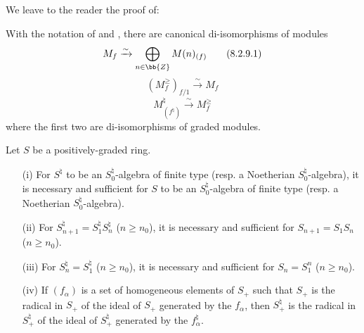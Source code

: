 We leave to the reader the proof of:
\begin{lemma}[8.2.9]
\label{II.8.2.9}
With the notation of  and , there are canonical di-isomorphisms of modules
\[
\label{II.8.2.9.1}
  M_f \xrightarrow{\sim} \bigoplus_{n\in\bb{Z}} M(n)_{(f)}
\tag{8.2.9.1}
\]
\[
\label{II.8.2.9.2}
  (M_f^\geq)_{f/1} \xrightarrow{\sim} M_f
\tag{8.2.9.2}
\]
\[
\label{II.8.2.9.3}
  M_{(f^\natural)}^\natural \xrightarrow{\sim} M_f^\geq
\tag{8.2.9.3}
\]
where the first two are di-isomorphisms of graded modules.
\end{lemma}

\begin{lemma}[8.2.10]
\label{II.8.2.10}
Let $S$ be a positively-graded ring.
\begin{enumerate}
  \item[\rm{(i)}] For $S^\natural$ to be an $S_0^\natural$-algebra of finite type (resp. a Noetherian $S_0^\natural$-algebra), it is necessary and sufficient for $S$ to be an $S_0^\natural$-algebra of finite type (resp. a Noetherian $S_0^\natural$-algebra).
  \item[\rm{(ii)}] For $S_{n+1}^\natural = S_1^\natural S_n^\natural$ ($n\geq n_0$), it is necessary and sufficient for $S_{n+1}=S_1S_n$ ($n\geq n_0$).
  \item[\rm{(iii)}] For $S_n^\natural = S_1^\natural$ ($n\geq n_0$), it is necessary and sufficient for $S_n=S_1^n$ ($n\geq n_0$).
  \item[\rm{(iv)}] If $(f_\alpha)$ is a set of homogeneous elements of $S_+$ such that $S_+$ is the radical in $S_+$ of the ideal of $S_+$ generated by the $f_\alpha$, then $S_+^\natural$ is the radical in $S_+^\natural$ of the ideal of $S_+^\natural$ generated by the $f_\alpha^\natural$.
\end{enumerate}
\end{lemma}

